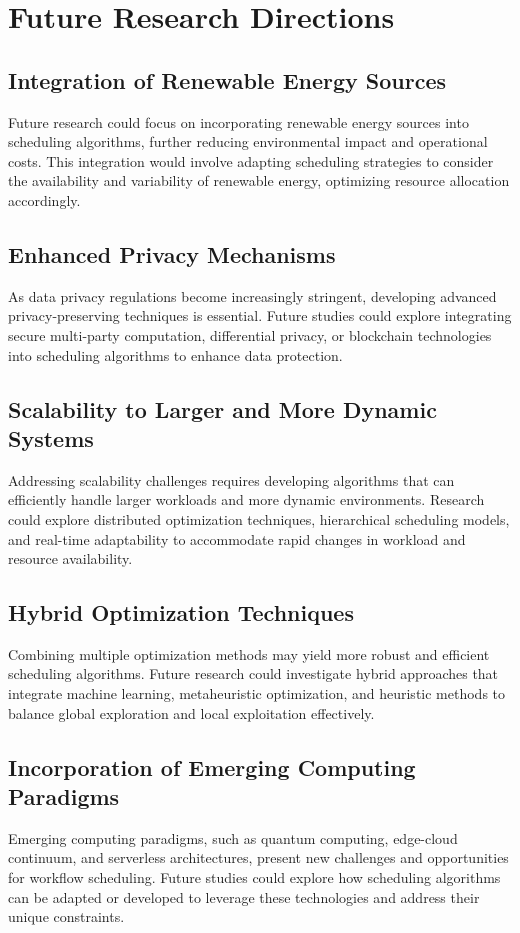 \documentclass[a4paper, final]{article}
\begin{document}
\section{Future Research Directions}
\subsection{Integration of Renewable Energy Sources}
Future research could focus on incorporating renewable energy sources into scheduling algorithms, further 
reducing environmental impact and operational costs. This integration would involve adapting scheduling strategies
 to consider the availability and variability of renewable energy, optimizing resource allocation accordingly.

\subsection{Enhanced Privacy Mechanisms}
As data privacy regulations become increasingly stringent, developing advanced privacy-preserving techniques is 
essential. Future studies could explore integrating secure multi-party computation, differential privacy, or blockchain 
technologies into scheduling algorithms to enhance data protection.

\subsection{Scalability to Larger and More Dynamic Systems}
Addressing scalability challenges requires developing algorithms that can efficiently handle larger workloads and 
more dynamic environments. Research could explore distributed optimization techniques, hierarchical scheduling models, 
and real-time adaptability to accommodate rapid changes in workload and resource availability.

\subsection{Hybrid Optimization Techniques}
Combining multiple optimization methods may yield more robust and efficient scheduling algorithms. Future research could 
investigate hybrid approaches that integrate machine learning, metaheuristic optimization, and heuristic methods to balance 
global exploration and local exploitation effectively.

\subsection{Incorporation of Emerging Computing Paradigms}
Emerging computing paradigms, such as quantum computing, edge-cloud continuum, and serverless architectures, present new 
challenges and opportunities for workflow scheduling. Future studies could explore how scheduling algorithms can be 
adapted or developed to leverage these technologies and address their unique constraints.
\end{document}
